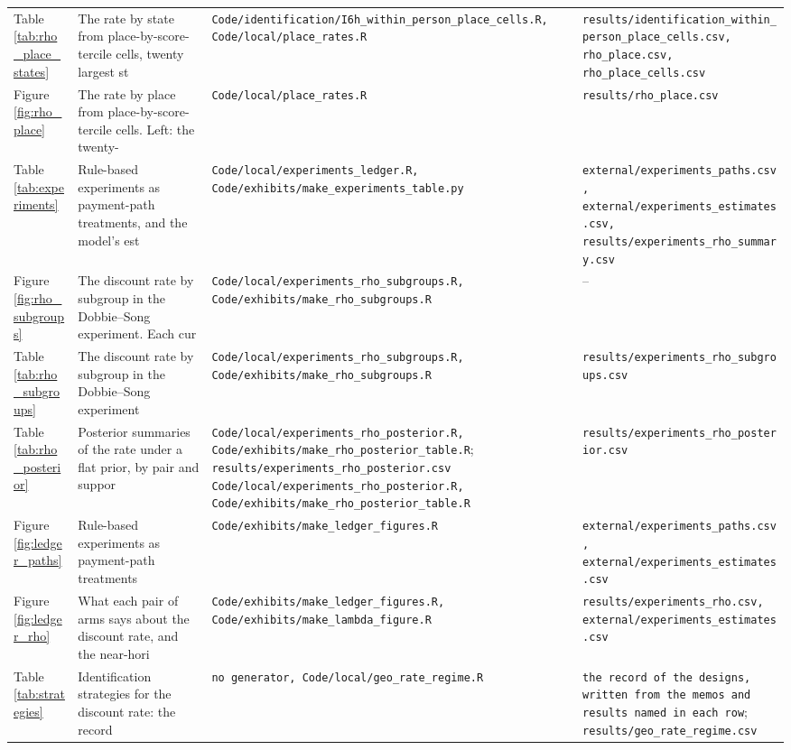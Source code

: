 \begin{longtable}{@{}p{}p{}p{}p{}@{}}
Table \ref{tab:rho_place_states} & The rate by state from place-by-score-tercile cells, twenty largest st & \texttt{Code/identification/I6h\_within\_person\_place\_cells.R, Code/local/place\_rates.R} & \texttt{results/identification\_within\_person\_place\_cells.csv, rho\_place.csv, rho\_place\_cells.csv} \\
Figure \ref{fig:rho_place} & The rate by place from place-by-score-tercile cells. Left: the twenty- & \texttt{Code/local/place\_rates.R} & \texttt{results/rho\_place.csv} \\
Table \ref{tab:experiments} & Rule-based experiments as payment-path treatments, and the model's est & \texttt{Code/local/experiments\_ledger.R, Code/exhibits/make\_experiments\_table.py} & \texttt{external/experiments\_paths.csv, external/experiments\_estimates.csv, results/experiments\_rho\_summary.csv} \\
Figure \ref{fig:rho_subgroups} & The discount rate by subgroup in the Dobbie--Song experiment. Each cur & \texttt{Code/local/experiments\_rho\_subgroups.R, Code/exhibits/make\_rho\_subgroups.R} & -- \\
Table \ref{tab:rho_subgroups} & The discount rate by subgroup in the Dobbie--Song experiment & \texttt{Code/local/experiments\_rho\_subgroups.R, Code/exhibits/make\_rho\_subgroups.R} & \texttt{results/experiments\_rho\_subgroups.csv} \\
Table \ref{tab:rho_posterior} & Posterior summaries of the rate under a flat prior, by pair and suppor & \texttt{Code/local/experiments\_rho\_posterior.R, Code/exhibits/make\_rho\_posterior\_table.R}; \texttt{results/experiments\_rho\_posterior.csv Code/local/experiments\_rho\_posterior.R, Code/exhibits/make\_rho\_posterior\_table.R} & \texttt{results/experiments\_rho\_posterior.csv} \\
Figure \ref{fig:ledger_paths} & Rule-based experiments as payment-path treatments & \texttt{Code/exhibits/make\_ledger\_figures.R} & \texttt{external/experiments\_paths.csv, external/experiments\_estimates.csv} \\
Figure \ref{fig:ledger_rho} & What each pair of arms says about the discount rate, and the near-hori & \texttt{Code/exhibits/make\_ledger\_figures.R, Code/exhibits/make\_lambda\_figure.R} & \texttt{results/experiments\_rho.csv, external/experiments\_estimates.csv} \\
Table \ref{tab:strategies} & Identification strategies for the discount rate: the record & \texttt{no generator, Code/local/geo\_rate\_regime.R} & \texttt{the record of the designs, written from the memos and results named in each row}; \texttt{results/geo\_rate\_regime.csv} \\

\end{longtable}
